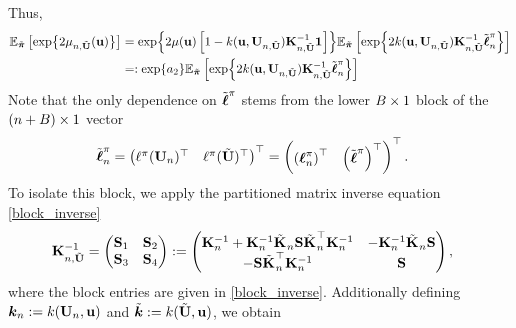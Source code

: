 \documentclass[12pt]{article}
\begin{document}
Thus, 
\begin{align}
\E_{\tilde{\boldsymbol{\postDens}}}\left[\Exp{2 \logUnPostMeanPred[\designIdx, \batchMat](\bpar)} \right] 
&= \Exp{2\logUnPostMean(\bpar) \left[1 -  \logUnPostKer(\bpar, \designMat[\designIdx, \batchMat]) \KerMat[\designIdx, \batchMat]^{-1}\oneVec\right] }
\E_{\tilde{\boldsymbol{\postDens}}}\left[\Exp{2\logUnPostKer(\bpar, \designMat[\designIdx, \batchMat]) \KerMat[\designIdx, \batchMat]^{-1} \logUnPostObsBatch}\right]  \label{IVAR_LNP_derivation_exp_mean_term} \\
&=: \Exp{a_2} \E_{\tilde{\boldsymbol{\postDens}}}\left[\Exp{2\logUnPostKer(\bpar, \designMat[\designIdx, \batchMat]) \KerMat[\designIdx, \batchMat]^{-1} \logUnPostObsBatch}\right] \nonumber
\end{align}
Note that the only dependence on $\logUnPostBatch$ stems from the lower $\Nbatch \times 1$ block of the $(\designIdx + \Nbatch) \times 1$ vector 
\begin{align*}
\logUnPostObsBatch
&= \begin{pmatrix} \logUnPost(\designMat)^\top & \logUnPost(\batchMat)^\top  \end{pmatrix}^\top = 
\begin{pmatrix} \left(\logUnPostObs\right)^\top & \left(\logUnPostBatch\right)^\top  \end{pmatrix}^\top.
\end{align*}
To isolate this block, we apply the partitioned matrix inverse equation \ref{block_inverse}
\begin{align*}
\KerMat[\designIdx, \batchMat]^{-1} &= \begin{pmatrix} \bS_{1} & \bS_{2} \\  \bS_{3} & \bS_{4} \end{pmatrix} := 
\begin{pmatrix} 
	\KerMat^{-1} + \KerMat^{-1}\tilde{\KerMat[]}_{\designIdx}\mathbf{S} \tilde{\KerMat[]}_{\designIdx}^\top \KerMat^{-1} & -\KerMat^{-1}\tilde{\KerMat[]}_{\designIdx} \mathbf{S}  \\
	-\mathbf{S} \tilde{\KerMat[]}_{\designIdx}^\top \KerMat^{-1} & \mathbf{S}  
\end{pmatrix},
\end{align*}
where the block entries are given in \ref{block_inverse}. Additionally defining 
$\boldsymbol{\logUnPostKer}_{\designIdx} := \logUnPostKer(\designMat, \bpar)$ and $\tilde{\boldsymbol{\logUnPostKer}} := \logUnPostKer(\batchMat, \bpar)$, we obtain 
\end{document}
